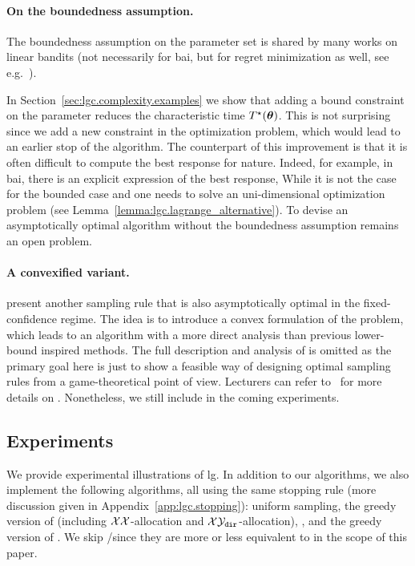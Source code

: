 \paragraph{On the boundedness assumption.}
The boundedness assumption on the parameter set is shared by many works on linear bandits (not necessarily for \gls{bai}, but for regret minimization as well, see e.g.~\citealt{abbasi-yadkori2011linear,soare2014linear}). 

In Section~\ref{sec:lgc.complexity.examples} we show that adding a bound constraint on the parameter reduces the characteristic time $T^{\star}({\boldsymbol \theta})$. This is not surprising since we add a new constraint in the optimization problem, which would lead to an earlier stop of the algorithm. The counterpart of this improvement is that it is often difficult to compute the best response for nature. Indeed, for example, in \gls{bai}, there is an explicit expression of the best response, While it is not the case for the bounded case and one needs to solve an uni-dimensional optimization problem (see Lemma~\ref{lemma:lgc.lagrange_alternative}). To devise an asymptotically optimal algorithm without the boundedness assumption remains an open problem.

\paragraph{A convexified variant.}
\cite{degenne2020game} present another sampling rule \LGC{} that is also asymptotically optimal in the fixed-confidence regime. The idea is to introduce a convex formulation of the problem, which leads to an algorithm with a more direct analysis than previous lower-bound inspired methods. The full description and analysis of \LGC{} is omitted as the primary goal here is just to show a feasible way of designing optimal sampling rules from a game-theoretical point of view. Lecturers can refer to~\cite{degenne2020game} for more details on \LGC{}. Nonetheless, we still include \LGC{} in the coming experiments.

\subsection{Experiments}\label{sec:lgc.game.experiments}

We provide experimental illustrations of \gls{lg}. In addition to our algorithms, we also implement the following algorithms, all using the same stopping rule (more discussion given in Appendix~\ref{app:lgc.stopping}): uniform sampling, the greedy version of \XYS (including $\mathcal{X}\mathcal{X}$-allocation and $\mathcal{X}\mathcal{Y}_{\texttt{dir}}$-allocation), \XYA, and the greedy version of \LGapE. We skip \GLUCB/\GLGapE since they are more or less equivalent to \LGapE in the scope of this paper.

